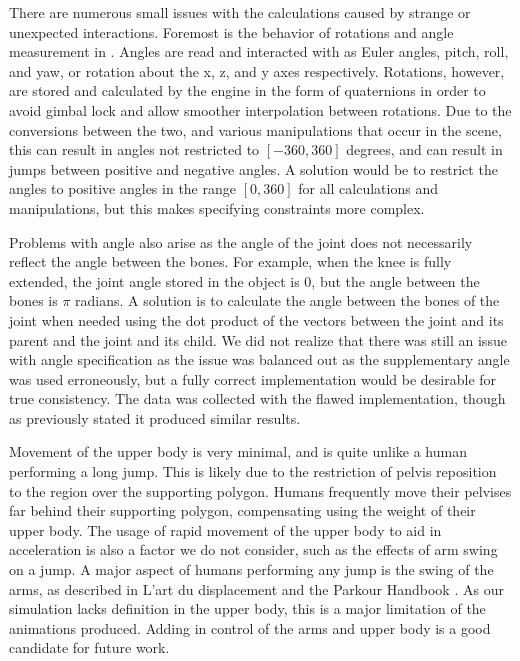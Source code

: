 There are numerous small issues with the calculations caused by strange or unexpected interactions.  Foremost is the behavior of rotations and angle measurement in \unity{}.  Angles are read and interacted with as Euler angles, pitch, roll, and yaw, or rotation about the x, z, and y axes respectively.  Rotations, however, are stored and calculated by the engine in the form of quaternions in order to avoid gimbal lock and allow smoother interpolation between rotations.  Due to the conversions between the two, and various manipulations that occur in the scene, this can result in angles not restricted to $[-360, 360]$ degrees, and can result in jumps between positive and negative angles.  A solution would be to restrict the angles to positive angles in the range $[0,360]$ for all calculations and manipulations, but this makes specifying constraints more complex.  

Problems with angle also arise as the angle of the joint does not necessarily reflect the angle between the bones.  For example, when the knee is fully extended, the joint angle stored in the object is 0, but the angle between the bones is $\pi$ radians.  A solution is to calculate the angle between the bones of the joint when needed using the dot product of the vectors between the joint and its parent and the joint and its child.  We did not realize that there was still an issue with angle specification as the issue was balanced out as the supplementary angle was used erroneously, but a fully correct implementation would be desirable for true consistency.  The data was collected with the flawed implementation, though as previously stated it produced similar results.

Movement of the upper body is very minimal, and is quite unlike a human performing a long jump.  This is likely due to the restriction of pelvis reposition to the region over the supporting polygon.  Humans frequently move their pelvises far behind their supporting polygon, compensating using the weight of their upper body.  The usage of rapid movement of the upper body to aid in acceleration is also a factor we do not consider, such as the effects of arm swing on a jump.  A major aspect of humans performing any jump is the swing of the arms, as described in L'art du displacement and the Parkour Handbook \cite{parkour1, parkour2}.  As our simulation lacks definition in the upper body, this is a major limitation of the animations produced.  Adding in control of the arms and upper body is a good candidate for future work.

